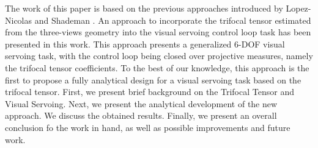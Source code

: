 The work of this paper is based on the previous approaches introduced by Lopez-Nicolas \cite{lopez2010visual} and Shademan \cite{shademan2010three}. An approach to incorporate the trifocal tensor estimated from the three-views geometry into the visual servoing control loop task has been presented in this work. This approach presents a generalized 6-DOF visual servoing task, with the control loop being closed over projective measures, namely the trifocal tensor coefficients. To the best of our knowledge, this approach is the first to propose a fully analytical design for a visual servoing task based on the trifocal tensor. First, we present brief background on the Trifocal Tensor and Visual Servoing. Next, we present the analytical development of the new approach. We discuss the obtained results. Finally, we present an overall conclusion fo the work in hand, as well as possible improvements and future work.
